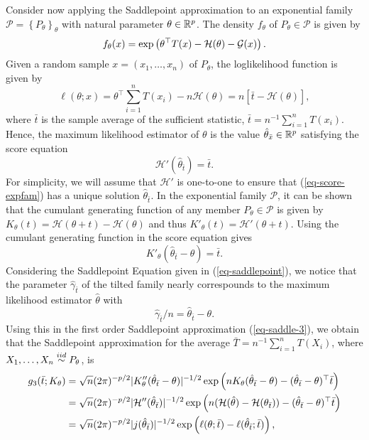 Consider now applying the Saddlepoint approximation to an exponential family $\mathcal{P} = \left\{P_\theta\right\}_{\theta}$ with natural parameter $\theta \in {\mathbb{R}^p}$. The density $f_\theta$ of $P_\theta \in \mathcal{P}$ is given by
\begin{equation*}
    f_\theta(x) = \exp\left(\theta^\top T(x) - \mathcal{H}(\theta) - \mathcal{G}(x)\right).
\end{equation*}
Given a random sample $x = (x_1, \ldots, x_n)$ of $P_\theta$, the loglikelihood function is given by
\begin{equation*}
    \ell(\theta; x) = \theta^\top \sum_{i=1}^n T(x_i) - n \mathcal{H}(\theta) = n\left[\bar t - \mathcal{H}(\theta)\right],
\end{equation*}
where $\bar t$ is the sample average of the sufficient statistic, $\bar t = n^{-1}\sum_{i=1}^n T(x_i)$. Hence, the maximum likelihood estimator of $\theta$ is the value $\hat\theta_{\bar x} \in {\mathbb{R}^p}$ satisfying the score equation
\begin{equation} \label{eq-score-expfam}
    \mathcal{H}'(\hat\theta_{\bar t}) = \bar t.
\end{equation}
For simplicity, we will assume that $\mathcal{H}'$ is one-to-one to ensure that (\ref{eq-score-expfam}) has a unique solution $\hat\theta_{\bar t}$. In the exponential family $\mathcal{P}$, it can be shown that the cumulant generating function of any member $P_\theta \in \mathcal{P}$ is given by $K_\theta(t) = \mathcal{H}(\theta + t) - \mathcal{H}(\theta)$ and thus $K'_\theta(t) = \mathcal{H}'(\theta + t)$. Using the cumulant generating function in the score equation gives
\begin{equation*}
    K'_\theta(\hat\theta_{\bar t} - \theta) = \bar t.
\end{equation*}
Considering the Saddlepoint Equation given in (\ref{eq-saddlepoint}), we notice that the  parameter $\hat\gamma_{\bar t}$ of the tilted family nearly correspounds to the maximum likelihood estimator $\hat\theta$ with
\begin{equation*}
    \hat\gamma_{\bar t}/n = \hat\theta_{\bar t} - \theta.
\end{equation*}
Using this in the first order Saddlepoint approximation (\ref{eq-saddle-3}), we obtain that the Saddlepoint approximation for the average $\bar T = n^{-1}\sum_{i=1}^n T(X_i)$,  where $X_1, \ldots, X_n \stackrel{iid}{\sim} P_\theta$, is
\begin{align*}
    g_3(\bar t; K_\theta) 
    &= \sqrt{n} (2\pi)^{-p/2}|K_\theta''(\hat\theta_{\bar t} - \theta)|^{-1/2} \exp\left(nK_\theta(\hat\theta_{\bar t} - \theta) - (\hat\theta_{\bar t} - \theta)^\top \bar t\right)\\
    &= \sqrt{n} (2\pi)^{-p/2}|\mathcal{H}''(\hat\theta_{\bar t})|^{-1/2} \exp\left(n(\mathcal{H}(\hat\theta) - \mathcal{H}(\theta_{\bar t})) - (\hat\theta_{\bar t} - \theta)^\top \bar t\right)\\
    &= \sqrt{n} (2\pi)^{-p/2}|j(\hat\theta_{\bar t})|^{-1/2} \exp\left(\ell(\theta; \bar t) - \ell(\hat\theta_{\bar t}; \bar t)\right),
\end{align*}
